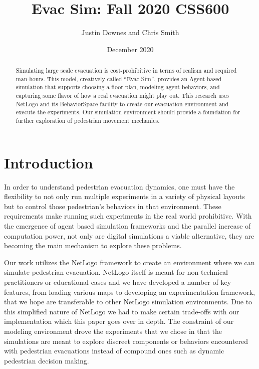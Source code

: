 \documentclass[12pt,letterpaper]{article}
\begin{document}
\title{Evac Sim: Fall 2020 CSS600 }

\author{Justin Downes and Chris Smith}
\date{December 2020}
\maketitle

\begin{abstract}
Simulating large scale evacuation is cost-prohibitive in terms of realism and required man-hours. This model, creatively called ``Evac Sim'', provides an Agent-based simulation that supports choosing a floor plan, modeling agent behaviors, and capturing some flavor of how a real evacuation might play out. This research uses NetLogo and its BehaviorSpace facility to create our evacuation environment and execute the experiments.  Our simulation environment should provide a foundation for further exploration of pedestrian movement mechanics.
\end{abstract}
\section {Introduction}

In order to understand pedestrian evacuation dynamics, one must have the flexibility to not only run multiple experiments in a variety of physical layouts but to control those pedestrian's behaviors in that environment.  These requirements make running such experiments in the real world prohibitive.  With the emergence of agent based simulation frameworks and the parallel increase of computation power, not only are digital simulations a viable alternative, they are becoming the main mechanism to explore these problems.

Our work utilizes the NetLogo framework to create an environment where we can simulate pedestrian evacuation.  NetLogo itself is meant for non technical practitioners or educational cases and we have developed a number of key features, from loading various maps to developing an experimentation framework, that we hope are transferable to other NetLogo simulation environments.  Due to this simplified nature of NetLogo we had to make certain trade-offs with our implementation which this paper goes over in depth.  The constraint of our modeling environment drove the experiments that we chose in that the simulations are meant to explore discreet components or behaviors encountered with pedestrian evacuations instead of compound ones such as dynamic pedestrian decision making.  
\end{document}
